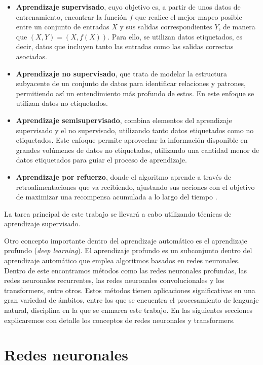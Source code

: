 \documentclass[11pt,spanish,listoffigures,listoftables]{tfgetsinf}
\begin{document}
\begin{itemize}
	\item \textbf{Aprendizaje supervisado}, cuyo objetivo es, a partir de unos datos de entrenamiento, encontrar la función $f$ que realice el mejor mapeo posible entre un conjunto de entradas $X$ y sus salidas correspondientes $Y$, de manera que $(X, Y) = (X, f(X))$. Para ello, se utilizan datos etiquetados, es decir, datos que incluyen tanto las entradas como las salidas correctas asociadas.
	\item \textbf{Aprendizaje no supervisado}, que trata de modelar la estructura subyacente de un conjunto de datos para identificar relaciones y patrones, permitiendo así un entendimiento más profundo de estos. En este enfoque se utilizan datos no etiquetados.
	\item \textbf{Aprendizaje semisupervisado}, combina elementos del aprendizaje supervisado y el no supervisado, utilizando tanto datos etiquetados como no etiquetados. Este enfoque permite aprovechar la información disponible en grandes volúmenes de datos no etiquetados, utilizando una cantidad menor de datos etiquetados para guiar el proceso de aprendizaje.
	\item \textbf{Aprendizaje por refuerzo}, donde el algoritmo aprende a través de retroalimentaciones que va recibiendo, ajustando sus acciones con el objetivo de maximizar una recompensa acumulada a lo largo del tiempo \cite{mirtaheri2022machine}.

\end{itemize}

La tarea principal de este trabajo se llevará a cabo utilizando técnicas de aprendizaje supervisado.

Otro concepto importante dentro del aprendizaje automático es el aprendizaje profundo (\textit{deep learning}). El aprendizaje profundo es un subconjunto dentro del aprendizaje automático que emplea algoritmos basados en redes neuronales. Dentro de este encontramos métodos como las redes neuronales profundas, las redes neuronales recurrentes, las redes neuronales convolucionales y los transformers, entre otros. Estos métodos tienen aplicaciones significativas en una gran variedad de ámbitos, entre los que se encuentra el procesamiento de lenguaje natural, disciplina en la que se enmarca este trabajo. En las siguientes secciones explicaremos con detalle los conceptos de redes neuronales y transformers.

\section{Redes neuronales} \label{redesNeuronales}
\end{document}
